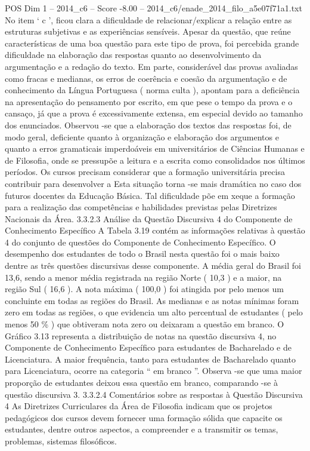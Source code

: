 \begin{textsample}{POS Dim 1 – 2014\_c6 – Score -8.00 – 2014\_c6/enade\_2014\_filo\_a5e07f71a1.txt}
No item ‘ c ’, ficou clara a dificuldade de relacionar/explicar a relação entre as estruturas subjetivas e as experiências sensíveis.
Apesar da questão, que reúne características de uma boa questão para este tipo de prova, foi percebida grande dificuldade na elaboração das respostas quanto ao desenvolvimento da argumentação e a redação do texto.
Em parte, considerável das provas avaliadas como fracas e medianas, os erros de coerência e coesão da argumentação e de conhecimento da Língua Portuguesa ( norma culta ), apontam para a deficiência na apresentação do pensamento por escrito, em que pese o tempo da prova e o cansaço, já que a prova é excessivamente extensa, em especial devido ao tamanho dos enunciados.
Observou -se que a elaboração dos textos das respostas foi, de modo geral, deficiente quanto à organização e elaboração dos argumentos e quanto a erros gramaticais imperdoáveis em universitários de Ciências Humanas e de Filosofia, onde se pressupõe a leitura e a escrita como consolidados nos últimos períodos.
Os cursos precisam considerar que a formação universitária precisa contribuir para desenvolver a Esta situação torna -se mais dramática no caso dos futuros docentes da Educação Básica.
Tal dificuldade põe em xeque a formação para a realização das competências e habilidades previstas pelas Diretrizes Nacionais da Área. 3.3.2.3 Análise da Questão Discursiva 4 do Componente de Conhecimento Específico A Tabela 3.19 contém as informações relativas à questão 4 do conjunto de questões do Componente de Conhecimento Específico.
O desempenho dos estudantes de todo o Brasil nesta questão foi o mais baixo dentre as três questões discursivas desse componente.
A média geral do Brasil foi 13,6, sendo a menor média registrada na região Norte ( 10,3 ) e a maior, na região Sul ( 16,6 ).
A nota máxima ( 100,0 ) foi atingida por pelo menos um concluinte em todas as regiões do Brasil.
As medianas e as notas mínimas foram zero em todas as regiões, o que evidencia um alto percentual de estudantes ( pelo menos 50 \% ) que obtiveram nota zero ou deixaram a questão em branco.
O Gráfico 3.13 representa a distribuição de notas na questão discursiva 4, no Componente de Conhecimento Específico para estudantes de Bacharelado e de Licenciatura.
A maior frequência, tanto para estudantes de Bacharelado quanto para Licenciatura, ocorre na categoria “ em branco ”.
Observa -se que uma maior proporção de estudantes deixou essa questão em branco, comparando -se à questão discursiva 3. 3.3.2.4 Comentários sobre as respostas à Questão Discursiva 4 As Diretrizes Curriculares da Área de Filosofia indicam que os projetos pedagógicos dos cursos devem fornecer uma formação sólida que capacite os estudantes, dentre outros aspectos, a compreender e a transmitir os temas, problemas, sistemas filosóficos.

\end{textsample}
